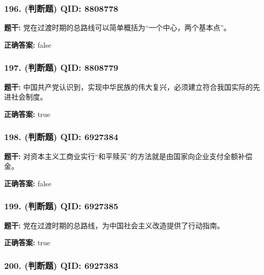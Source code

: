 \documentclass[12pt,UTF8]{ctexart}
\begin{document}
\vspace{0.3em}\hrulefill\vspace{0.7em}

\subsubsection*{196. (判断题) \small QID: 8808778}

\textbf{题干:}
党在过渡时期的总路线可以简单概括为“一个中心，两个基本点”。

\textbf{正确答案:}
false

\vspace{0.3em}\hrulefill\vspace{0.7em}

\subsubsection*{197. (判断题) \small QID: 8808779}

\textbf{题干:}
中国共产党认识到，实现中华民族的伟大复兴，必须建立符合我国实际的先进社会制度。

\textbf{正确答案:}
true

\vspace{0.3em}\hrulefill\vspace{0.7em}

\subsubsection*{198. (判断题) \small QID: 6927384}

\textbf{题干:}
对资本主义工商业实行“和平赎买”的方法就是由国家向企业支付全额补偿金。

\textbf{正确答案:}
false

\vspace{0.3em}\hrulefill\vspace{0.7em}

\subsubsection*{199. (判断题) \small QID: 6927385}

\textbf{题干:}
党在过渡时期的总路线，为中国社会主义改造提供了行动指南。

\textbf{正确答案:}
true

\vspace{0.3em}\hrulefill\vspace{0.7em}

\subsubsection*{200. (判断题) \small QID: 6927383}
\end{document}
